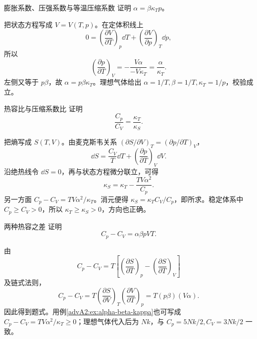 \begin{advexamplebox}{膨胀系数、压强系数与等温压缩系数}\label{advA2:ex:alpha-beta-kappa}
证明 $\alpha=\beta\kappa_Tp$。

\AQResponse
\end{advexamplebox}
\begin{advsolution}
\AAResponse

把状态方程写成 $V=V(T,p)$。在定体积线上
\[
 0=\left(\frac{\partial V}{\partial T}\right)_p\dd T
 +\left(\frac{\partial V}{\partial p}\right)_T\dd p,
\]
所以
\[
 \left(\frac{\partial p}{\partial T}\right)_V
 =-\frac{V\alpha}{-V\kappa_T}=\frac{\alpha}{\kappa_T}.
\]
左侧又等于 $p\beta$，故 $\boxed{\alpha=p\beta\kappa_T}$。理想气体给出
$\alpha=1/T,\beta=1/T,\kappa_T=1/p$，校验成立。
\end{advsolution}

\begin{advexamplebox}{热容比与压缩系数比}\label{advA2:ex:cp-cv-kappa}
证明
\[
 \boxed{\frac{C_p}{C_V}=\frac{\kappa_T}{\kappa_S}}.
\]

\AQCompressibilities
\end{advexamplebox}
\begin{advsolution}
\AACompressibilities

把熵写成 $S(T,V)$。由麦克斯韦关系
$(\partial S/\partial V)_T=(\partial p/\partial T)_V$，
\[
 \dd S=\frac{C_V}{T}\dd T
 +\left(\frac{\partial p}{\partial T}\right)_V\dd V.
\]
沿绝热线令 $\dd S=0$，再与状态方程微分联立，可得
\[
 \kappa_S=\kappa_T-\frac{TV\alpha^2}{C_p}.
\]
另一方面
$C_p-C_V=TV\alpha^2/\kappa_T$。消元便得
$\kappa_S=\kappa_TC_V/C_p$，即所求。稳定体系中
$C_p\ge C_V>0$，所以 $\kappa_T\ge\kappa_S>0$，方向也正确。
\end{advsolution}

\begin{advexamplebox}{两种热容之差}\label{advA2:ex:cp-minus-cv}
证明
\[
 \boxed{C_p-C_V=\alpha\beta pVT}.
\]

\AQHeatDifference
\end{advexamplebox}
\begin{advsolution}
\AAHeatDifference

由
\[
 C_p-C_V=T\left[\left(\frac{\partial S}{\partial T}\right)_p
 -\left(\frac{\partial S}{\partial T}\right)_V\right]
\]
及链式法则，
\[
 C_p-C_V
 =T\left(\frac{\partial S}{\partial V}\right)_T
 \left(\frac{\partial V}{\partial T}\right)_p
 =T(p\beta)(V\alpha).
\]
因此得到题式。用例\ref{advA2:ex:alpha-beta-kappa}也可写成
$C_p-C_V=TV\alpha^2/\kappa_T\ge0$；理想气体代入后为 $Nk$，与
$C_p=5Nk/2,C_V=3Nk/2$ 一致。
\end{advsolution}

\ASecondThermodynamicsLater


\clearpage\endgroup
